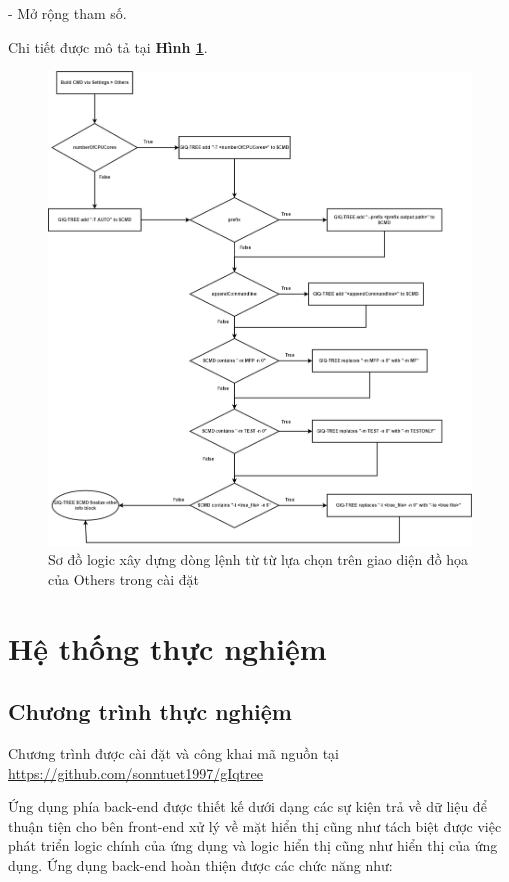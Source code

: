 \documentclass[12pt]{report}
\begin{document}
- Mở rộng tham số.

 Chi tiết được mô tả tại \textbf{Hình \ref{fig:image4.13}}.
 
 \begin{figure}[h]
	\centering
	\includegraphics[scale=0.4]{Image/4.13.png}
	\caption{Sơ đồ logic xây dựng dòng lệnh từ từ lựa chọn trên giao diện đồ họa của Others trong cài đặt }
	\label{fig:image4.13}
\end{figure}

\newpage	
\chapter{Hệ thống thực nghiệm}
\label{chap:chapter5}
\section{Chương trình thực nghiệm }

Chương trình được cài đặt và công khai mã nguồn tại \url{ https://github.com/sonntuet1997/gIqtree }

Ứng dụng phía back-end được thiết kế dưới dạng các sự kiện trả về dữ liệu để thuận tiện cho bên front-end xử lý về mặt hiển thị cũng như tách biệt được việc phát triển logic chính của ứng dụng và logic hiển thị cũng như hiển thị của ứng dụng. 
Ứng dụng back-end hoàn thiện được các chức năng như:
\end{document}
